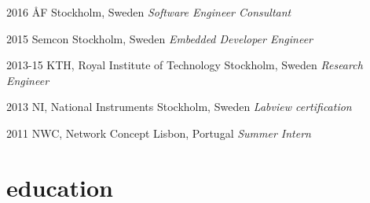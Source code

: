 \documentclass[]{friggeri-cv}
\begin{document}
\begin{entrylist}
	\entry
	{2016}
	{ÅF}
	{Stockholm, Sweden}
	{\emph{Software Engineer Consultant}}
\end{entrylist}

\begin{entrylist}
	\entry
	{2015}
	{Semcon}
	{Stockholm, Sweden}
	{ \emph{Embedded Developer Engineer} }
\end{entrylist}

\begin{entrylist}
	\entry
	{2013-15}
	{KTH, Royal Institute of Technology}
	{Stockholm, Sweden}
	{\emph{Research Engineer}}

\end{entrylist}

\begin{entrylist}
	\entry
	{2013}
	{NI, National Instruments}
	{Stockholm, Sweden}
	{ \emph{Labview certification} }
\end{entrylist}

\begin{entrylist}
	\entry
	{2011}
	{NWC, Network Concept}
	{Lisbon, Portugal}
	{\emph{Summer Intern}}
\end{entrylist}


\section{education}
\end{document}
